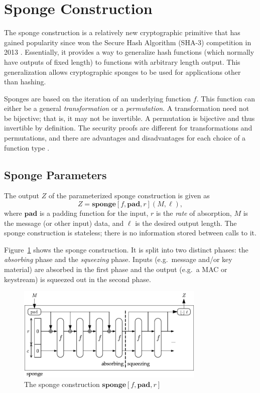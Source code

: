 \section{Sponge Construction}
\label{sec:SpongeAndDuplex}
The sponge construction is a relatively new cryptographic primitive that has gained popularity since \Keccak won the Secure Hash Algorithm (SHA-3) competition in 2013 \cite{Bertoni2011_KeccakReference}\cite{NIST2012_SHA3_Winner}.
Essentially, it provides a way to generalize hash functions (which normally have outputs of fixed length) to functions with arbitrary length output.
This generalization allows cryptographic sponges to be used for applications other than hashing.

Sponges are based on the iteration of an underlying function $f$.
This function can either be a general \emph{transformation} or a \emph{permutation}.
A transformation need not be bijective; that is, it may not be invertible.
A permutation is bijective and thus invertible by definition.
The security proofs are different for transformations and permutations, and there are advantages and disadvantages for each choice of a function type \cite{Bertoni2011_SpongeFunctions}.

\subsection{Sponge Parameters}
The output $Z$ of the parameterized sponge construction is given as
\begin{equation*}
\label{eq:SpongeOutput}
Z = \mathbf{sponge}[f,\mathbf{pad},r](M,\ell),
\end{equation*}
where $\mathbf{pad}$ is a padding function for the input, $r$ is the \emph{rate} of absorption, $M$ is the message (or other input) data, and $\ell$ is the desired output length.
The sponge construction is stateless; there is no information stored between calls to it.

Figure~\ref{fig:Sponge} shows the sponge construction.
It is split into two distinct phases: the \emph{absorbing} phase and the \emph{squeezing} phase.
Inputs (e.g.\ message and/or key material) are absorbed in the first phase and the output (e.g.\ a MAC or keystream) is squeezed out in the second phase.

\begin{figure}[ht]
\centering
\includegraphics[width=0.8\textwidth]{img/Sponge.pdf}
\caption{The sponge construction $\mathbf{sponge}[f,\mathbf{pad},r]$ \cite{Bertoni2011_SpongeFunctions}}
\label{fig:Sponge}
\end{figure}

